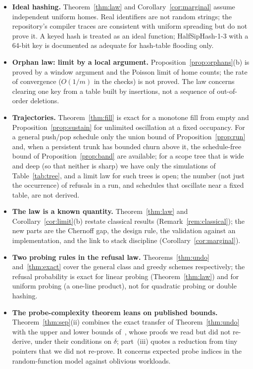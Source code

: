 \documentclass[11pt,a4paper]{article}
\theoremstyle{definition}
\theoremstyle{remark}
\begin{document}
\begin{itemize}[leftmargin=*]
\item \textbf{Ideal hashing.} Theorem~\ref{thm:law} and Corollary~\ref{cor:marginal} assume independent uniform homes. Real identifiers are not random strings; the repository's compiler traces are consistent with uniform spreading but do not prove it. A keyed hash is treated as an ideal function; HalfSipHash-1-3 with a 64-bit key is documented as adequate for hash-table flooding only.
\item \textbf{Orphan law: limit by a local argument.} Proposition~\ref{prop:orphans}(b) is proved by a window argument and the Poisson limit of home counts; the rate of convergence ($O(1/m)$ in the checks) is not proved. The law concerns clearing one key from a table built by insertions, not a sequence of out-of-order deletions.
\item \textbf{Trajectories.} Theorem~\ref{thm:fill} is exact for a monotone fill from empty and Proposition~\ref{prop:sustain} for unlimited oscillation at a fixed occupancy. For a general push/pop schedule only the union bound of Proposition~\ref{prop:run} and, when a persistent trunk has bounded churn above it, the schedule-free bound of Proposition~\ref{prop:band} are available; for a scope tree that is wide and deep (so that neither is sharp) we have only the simulations of Table~\ref{tab:tree}, and a limit law for such trees is open; the number (not just the occurrence) of refusals in a run, and schedules that oscillate near a fixed table, are not derived.
\item \textbf{The law is a known quantity.} Theorem~\ref{thm:law} and Corollary~\ref{cor:limit}(b) restate classical results (Remark~\ref{rem:classical}); the new parts are the Chernoff gap, the design rule, the validation against an implementation, and the link to stack discipline (Corollary~\ref{cor:marginal}).
\item \textbf{Two probing rules in the refusal law.} Theorems~\ref{thm:undo} and~\ref{thm:exact} cover the general class and greedy schemes respectively; the refusal probability is exact for linear probing (Theorem~\ref{thm:law}) and for uniform probing (a one-line product), not for quadratic probing or double hashing.
\item \textbf{The probe-complexity theorem leans on published bounds.} Theorem~\ref{thm:sep}(ii) combines the exact transfer of Theorem~\ref{thm:undo} with the upper and lower bounds of~\cite{fkk2024}, whose proofs we read but did not re-derive, under their conditions on $\delta$; part~(iii) quotes a reduction from tiny pointers that we did not re-prove. It concerns expected probe indices in the random-function model against oblivious workloads.

\end{itemize}
\end{document}
